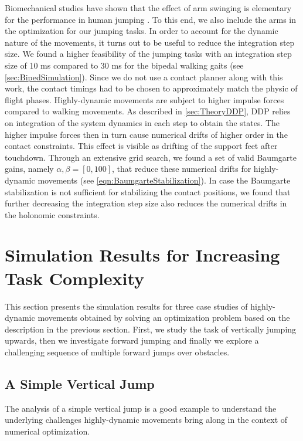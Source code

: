 Biomechanical studies have shown that the effect of arm swinging is elementary for the performance in human jumping \cite{harman1990effects}. To this end, we also include the arms in the optimization for our jumping tasks. 
In order to account for the dynamic nature of the movements, it turns out to be useful to reduce the integration step size. We found a higher feasibility of the jumping tasks with an integration step size of 10 ms compared to 30 ms for the bipedal walking gaits (see \cref{sec:BipedSimulation}). Since we do not use a contact planner along with this work, the contact timings had to be chosen to approximately match the physic of flight phases. 
Highly-dynamic movements are subject to higher impulse forces compared to walking movements. As described in \cref{sec:TheoryDDP}, \gls{DDP} relies on integration of the system dynamics in each step to obtain the states. The higher impulse forces then in turn cause numerical drifts of higher order in the contact constraints. This effect is visible as drifting of the support feet after touchdown. Through an extensive grid search, we found a set of valid Baumgarte gains, namely $\alpha,\beta=[0,100]$, that reduce these numerical drifts for highly-dynamic movements (see \cref{eqn:BaumgarteStabilization}). In case the Baumgarte stabilization is not sufficient for stabilizing the contact positions, we found that further decreasing the integration step size also reduces the numerical drifts in the holonomic constraints.

\section{Simulation Results for Increasing Task Complexity}\label{sec:HighlySimulation}
This section presents the simulation results for three case studies of highly-dynamic movements obtained by solving an optimization problem based on the description in the previous section. First, we study the task of vertically jumping upwards, then we investigate forward jumping and finally we explore a challenging sequence of multiple forward jumps over obstacles.

\subsection{A Simple Vertical Jump}
The analysis of a simple vertical jump is a good example to understand the underlying challenges highly-dynamic movements bring along in the context of numerical optimization.

